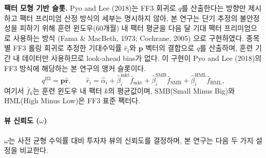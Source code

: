 \documentclass{article}
\begin{document}
\textbf{팩터 모형 기반 슬롯.} Pyo and Lee (2018)는 FF3 회귀로 $q$를 산출한다는 방향만 제시하고 팩터 프리미엄 산정 방식의 세부는 명시하지 않아, 본 연구는 단기 추정의 불안정성을 피하기 위해 훈련 윈도우(60개월) 내 팩터 평균을 다음 달 기대 팩터 프리미엄으로 사용하는 방식 (Fama & MacBeth, 1973; Cochrane, 2005) 으로 구현하였다. 종목별 FF3 롤링 회귀로 추정한 기대수익률 $\hat{r}_i$와 $\mathbf{p}$ 벡터의 결합으로 $q$를 산출하며, 훈련 기간 내 데이터만 사용하므로 look-ahead bias가 없다. 이 구현이 Pyo and Lee (2018)의 FF3 방식에 해당하는 본 연구의 앵커 슬롯이다.
\begin{equation}
  q^{\mathrm{ff3}} = \mathbf{p}\hat{\mathbf{r}}, \qquad
  \hat{r}_i = \hat{\alpha}_i + \hat{\beta}_i^{\mathrm{mkt}}\bar{f}_{\mathrm{mkt}} + \hat{\beta}_i^{\mathrm{SMB}}\bar{f}_{\mathrm{SMB}} + \hat{\beta}_i^{\mathrm{HML}}\bar{f}_{\mathrm{HML}},
\end{equation}
여기서 $\bar{f}_k$는 훈련 윈도우 내 팩터 $k$의 평균값이며, SMB(Small Minus Big)와 HML(High Minus Low)은 FF3 표준 팩터다.

\paragraph{뷰 신뢰도 ($\omega$)}

$\omega$는 사전 균형 수익률 대비 투자자 뷰의 신뢰도를 결정하며, 본 연구는 다음 두 가지 설정을 비교한다.
\end{document}
